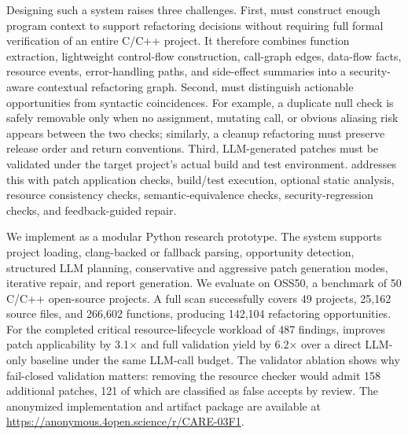 Designing such a system raises three challenges. First, \SysName{} must
construct enough program context to support refactoring decisions without
requiring full formal verification of an entire C/C++ project. It therefore
combines function extraction, lightweight control-flow construction, call-graph
edges, data-flow facts, resource events, error-handling paths, and side-effect
summaries into a security-aware contextual refactoring graph. Second,
\SysName{} must distinguish actionable opportunities from syntactic
coincidences. For example, a duplicate null check is safely removable only when
no assignment, mutating call, or obvious aliasing risk appears between the two
checks; similarly, a cleanup refactoring must preserve release order and return
conventions. Third, LLM-generated patches must be validated under the target
project's actual build and test environment. \SysName{} addresses this with
patch application checks, build/test execution, optional static analysis,
resource consistency checks, semantic-equivalence checks, security-regression
checks, and feedback-guided repair.

We implement \SysName{} as a modular Python research prototype. The system
supports project loading, clang-backed or fallback parsing, opportunity
detection, structured LLM planning, conservative and aggressive patch
generation modes, iterative repair, and report generation. We evaluate
\SysName{} on OSS50, a benchmark of 50 C/C++ open-source projects. A full scan
successfully covers 49 projects, 25,162 source files, and 266,602 functions,
producing 142,104 refactoring opportunities. For the completed critical
resource-lifecycle workload of 487 findings, \SysName{} improves patch
applicability by 3.1$\times$ and full validation yield by 6.2$\times$ over a
direct LLM-only baseline under the same LLM-call budget. The validator ablation
shows why fail-closed validation matters: removing the resource checker would
admit 158 additional patches, 121 of which are classified as false accepts by
review. The anonymized implementation and artifact package are available at
\url{https://anonymous.4open.science/r/CARE-03F1}.

